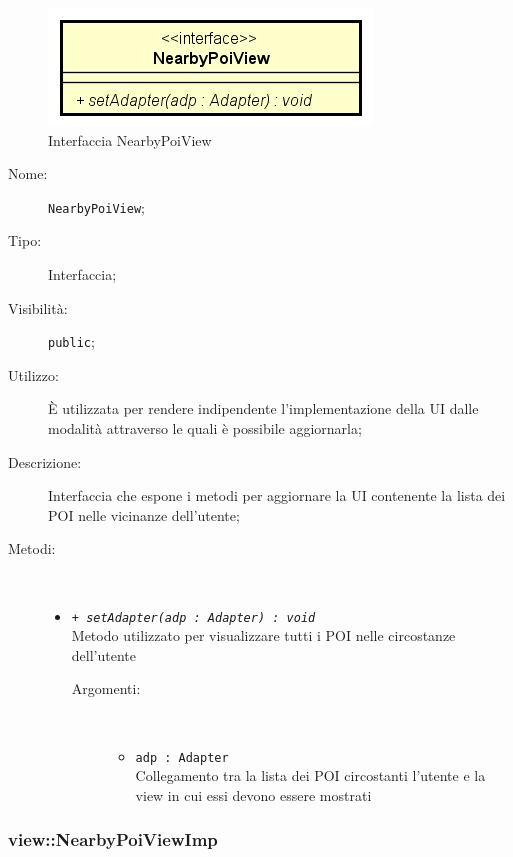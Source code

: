 \documentclass[../DefinizioneDiProdotto.tex]{subfiles}
\begin{document}
    \begin{figure}[H]
        \centering
        \includegraphics{img/NearbyPoiView.png}
        \caption{Interfaccia NearbyPoiView}\label{fig:view::NearbyPoiView} 
    \end{figure}
    \begin{description}
\item[Nome:] \texttt{NearbyPoiView};
\item[Tipo:] Interfaccia;
\item[Visibilità:] \texttt{public};
\item[Utilizzo:] È utilizzata per rendere indipendente l'implementazione della UI dalle modalità attraverso le quali è possibile aggiornarla;
\item[Descrizione:] Interfaccia che espone i metodi per aggiornare la UI contenente la lista dei POI nelle vicinanze dell'utente;
\item[Metodi:] \
\begin{itemize}
\item \texttt{+ \textit{setAdapter(adp : Adapter) : void}}\\
Metodo utilizzato per visualizzare tutti i POI nelle circostanze dell'utente
 \begin{description}
\item[Argomenti:] \
\begin{itemize}
\item \texttt{adp : Adapter}\\
Collegamento tra la lista dei POI circostanti l'utente e la view in cui essi devono essere mostrati\end{itemize}
\end{description}
\end{itemize}
\end{description}

\subsubsection{view::NearbyPoiViewImp}
\end{document}
